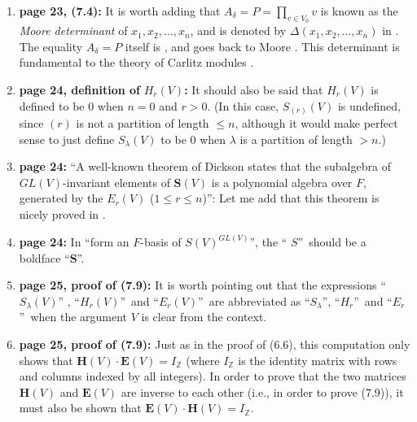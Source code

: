 \documentclass[numbers=enddot,12pt,final,onecolumn,notitlepage]{scrartcl}%
\theoremstyle{definition}
\let\prodnonlimits\prod
\renewcommand{\prod}{\prodnonlimits\limits}
\begin{document}
\begin{enumerate}
\item \textbf{page 23, (7.4):} It is worth adding that $A_{\delta}%
=P=\prod_{v\in V_{0}}v$ is known as the \emph{Moore determinant} of
$x_{1},x_{2},\ldots,x_{n}$, and is denoted by $\Delta\left(  x_{1}%
,x_{2},\ldots,x_{n}\right)  $ in \cite[Definition 1.3.2]{Goss98}. The equality
$A_{\delta}=P$ itself is \cite[Corollary 1.3.7]{Goss98}, and goes back to
Moore \cite[\S III]{Moore96}. This determinant is fundamental to the theory of
Carlitz modules \cite[Chapter 3]{Goss98}.

\item \textbf{page 24, definition of }$H_{r}\left(  V\right)  $\textbf{:} It
should also be said that $H_{r}\left(  V\right)  $ is defined to be $0$ when
$n=0$ and $r>0$. (In this case, $S_{\left(  r\right)  }\left(  V\right)  $ is
undefined, since $\left(  r\right)  $ is not a partition of length $\leq n$,
although it would make perfect sense to just define $S_{\lambda}\left(
V\right)  $ to be $0$ when $\lambda$ is a partition of length $>n$.)

\item \textbf{page 24:} \textquotedblleft A well-known theorem of Dickson
states that the subalgebra of $GL\left(  V\right)  $-invariant elements of
$\mathbf{S}\left(  V\right)  $ is a polynomial algebra over $F$, generated by
the $E_{r}\left(  V\right)  $ ($1\leq r\leq n$)\textquotedblright: Let me add
that this theorem is nicely proved in \cite[\S I.2, Example 27 parts (a) and
(d)]{Macdon95}.

\item \textbf{page 24:} In \textquotedblleft form an $F$-basis of $S\left(
V\right)  ^{GL\left(  V\right)  }$\textquotedblright, the \textquotedblleft%
$S$\textquotedblright\ should be a boldface \textquotedblleft$\mathbf{S}%
$\textquotedblright.

\item \textbf{page 25, proof of (7.9):} It is worth pointing out that the
expressions \textquotedblleft$S_{\lambda}\left(  V\right)  $\textquotedblright%
, \textquotedblleft$H_{r}\left(  V\right)  $\textquotedblright\ and
\textquotedblleft$E_{r}\left(  V\right)  $\textquotedblright\ are abbreviated
as \textquotedblleft$S_{\lambda}$\textquotedblright, \textquotedblleft$H_{r}%
$\textquotedblright\ and \textquotedblleft$E_{r}$\textquotedblright\ when the
argument $V$ is clear from the context.

\item \textbf{page 25, proof of (7.9):} Just as in the proof of (6.6), this
computation only shows that $\mathbf{H}\left(  V\right)  \cdot\mathbf{E}%
\left(  V\right)  =I_{\mathbb{Z}}$ (where $I_{\mathbb{Z}}$ is the identity
matrix with rows and columns indexed by all integers). In order to prove that
the two matrices $\mathbf{H}\left(  V\right)  $ and $\mathbf{E}\left(
V\right)  $ are inverse to each other (i.e., in order to prove (7.9)), it must
also be shown that $\mathbf{E}\left(  V\right)  \cdot\mathbf{H}\left(
V\right)  =I_{\mathbb{Z}}$.


\end{enumerate}
\end{document}
